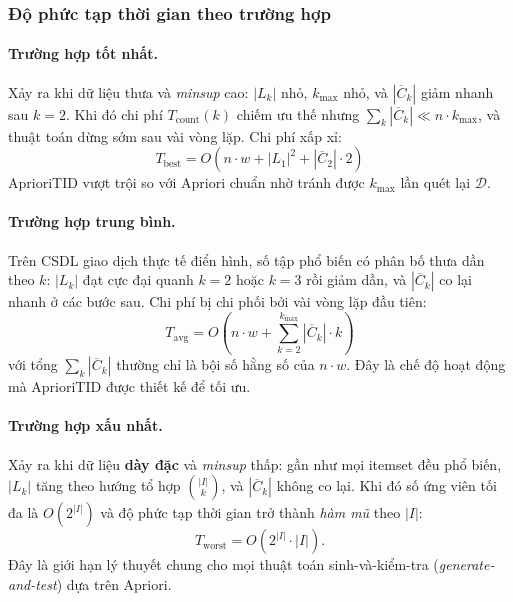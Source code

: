 \subsubsection{Độ phức tạp thời gian theo trường hợp}

\paragraph{Trường hợp tốt nhất.}
Xảy ra khi dữ liệu thưa và \textit{minsup} cao: $|L_k|$ nhỏ, $k_{\max}$ nhỏ, và $|\overline{C}_k|$ giảm nhanh sau $k = 2$. Khi đó chi phí $T_{\text{count}}(k)$ chiếm ưu thế nhưng $\sum_k |\overline{C}_k| \ll n \cdot k_{\max}$, và thuật toán dừng sớm sau vài vòng lặp. Chi phí xấp xỉ:
\begin{equation}
    \label{eq:equation-1-6}
    T_{\text{best}} = O(n \cdot w + |L_1|^2 + |\overline{C}_2| \cdot 2)
\end{equation}
AprioriTID vượt trội so với Apriori chuẩn nhờ tránh được $k_{\max}$ lần quét lại $\mathcal{D}$.

\paragraph{Trường hợp trung bình.}
Trên CSDL giao dịch thực tế điển hình, số tập phổ biến có phân bố thưa dần theo $k$: $|L_k|$ đạt cực đại quanh $k = 2$ hoặc $k = 3$ rồi giảm dần, và $|\overline{C}_k|$ co lại nhanh ở các bước sau. Chi phí bị chi phối bởi vài vòng lặp đầu tiên:
\begin{equation}
    \label{eq:equation-1-7}
    T_{\text{avg}} = O\!\left(n \cdot w + \sum_{k=2}^{k_{\max}} |\overline{C}_k| \cdot k\right)
\end{equation}
với tổng $\sum_k |\overline{C}_k|$ thường chỉ là bội số hằng số của $n \cdot w$. Đây là chế độ hoạt động mà AprioriTID được thiết kế để tối ưu.

\paragraph{Trường hợp xấu nhất.}
Xảy ra khi dữ liệu \textbf{dày đặc} và \textit{minsup} thấp: gần như mọi itemset đều phổ biến, $|L_k|$ tăng theo hướng tổ hợp $\binom{|I|}{k}$, và $|\overline{C}_k|$ không co lại. Khi đó số ứng viên tối đa là $O(2^{|I|})$ và độ phức tạp thời gian trở thành \textit{hàm mũ} theo $|I|$:
\begin{equation}
    \label{eq:equation-1-8}
    T_{\text{worst}} = O\!\left(2^{|I|} \cdot |I|\right).
\end{equation}
Đây là giới hạn lý thuyết chung cho mọi thuật toán sinh-và-kiểm-tra (\textit{generate-and-test}) dựa trên Apriori.

